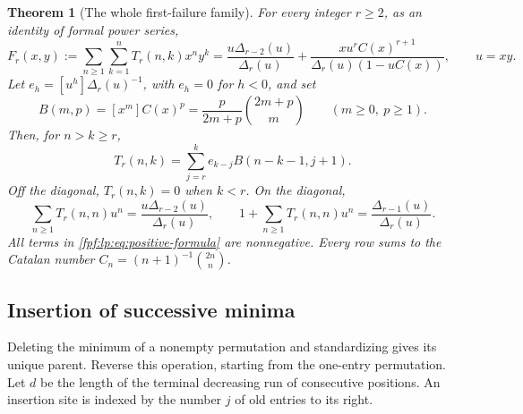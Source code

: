 \documentclass[11pt]{article}
\numberwithin{equation}{section}
\newtheorem{theorem}{Theorem}[section]
\theoremstyle{definition}
\begin{document}
\begin{theorem}[The whole first-failure family]\label{fpf:lp:thm:gf}
For every integer \(r\ge2\), as an identity of formal power series,
\begin{equation}\label{fpf:lp:eq:main-gf}
 \boxed{\displaystyle
 F_r(x,y):=\sum_{n\ge1}\sum_{k=1}^n T_r(n,k)x^ny^k
 =\frac{u\Delta_{r-2}(u)}{\Delta_r(u)}
  +\frac{x u^r C(x)^{r+1}}{\Delta_r(u)(1-uC(x))},\qquad u=xy.}
\end{equation}
Let \(e_h=[u^h]\Delta_r(u)^{-1}\), with \(e_h=0\) for \(h<0\), and set
\begin{equation}\label{fpf:lp:eq:ballot}
 B(m,p)=[x^m]C(x)^p
 =\frac{p}{2m+p}\binom{2m+p}{m}\qquad(m\ge0,\ p\ge1).
\end{equation}
Then, for \(n>k\ge r\),
\begin{equation}\label{fpf:lp:eq:positive-formula}
 T_r(n,k)=\sum_{j=r}^k e_{k-j}B(n-k-1,j+1).
\end{equation}
Off the diagonal, \(T_r(n,k)=0\) when \(k<r\). On the diagonal,
\begin{equation}\label{fpf:lp:eq:safe-total}
 \sum_{n\ge1}T_r(n,n)u^n=\frac{u\Delta_{r-2}(u)}{\Delta_r(u)},\qquad
 1+\sum_{n\ge1}T_r(n,n)u^n=\frac{\Delta_{r-1}(u)}{\Delta_r(u)}.
\end{equation}
All terms in \eqref{fpf:lp:eq:positive-formula} are nonnegative. Every row
sums to the Catalan number \(C_n=(n+1)^{-1}\binom{2n}{n}\).
\end{theorem}

\subsection{Insertion of successive minima}

Deleting the minimum of a nonempty permutation and standardizing gives
its unique parent. Reverse this operation, starting from the one-entry
permutation. Let \(d\) be the length of the terminal decreasing run of
consecutive positions. An insertion site is indexed by the number \(j\)
of old entries to its right.
\end{document}

